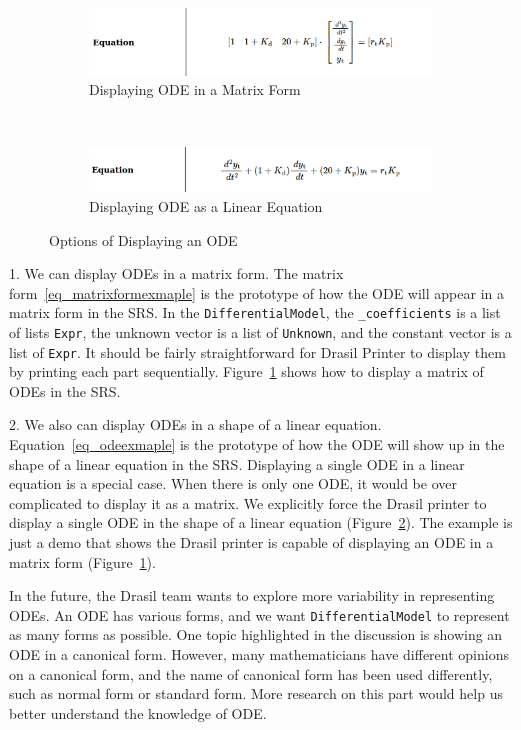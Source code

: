 \begin{figure}[ht]
	\centering
	\begin{subfigure}[t]{\textwidth}
		\centering
		
\includegraphics[width=1\textwidth]{figures/ODEInMatrix.png}
		\caption{Displaying ODE in a Matrix Form}
		\label{fig_multienv_odematrix}
	\end{subfigure}
	~
	\begin{subfigure}[t]{\textwidth}
		\centering
	
\includegraphics[width=1\textwidth]{figures/ODEInLinearEq.png}
		\caption{Displaying ODE as a Linear Equation}
		\label{fig_multienv_odelinear}
	\end{subfigure}
	
	\caption{Options of Displaying an ODE}
	\label{fig_multienv}
\end{figure}

1. We can display ODEs in a matrix form. The matrix form~\ref{eq_matrixformexmaple} is the prototype of how the ODE will appear in a matrix form in the SRS. In the \verb|DifferentialModel|, the \verb|_coefficients| is a list of lists \verb|Expr|, the unknown vector is a list of \verb|Unknown|, and the constant vector is a list of \verb|Expr|. It should be fairly straightforward for Drasil Printer to display them by printing each part sequentially. Figure~\ref{fig_multienv_odematrix} shows how to display a matrix of ODEs in the SRS. 

2. We also can display ODEs in a shape of a linear equation. Equation~\ref{eq_odeexmaple} is the prototype of how the ODE will show up in the shape of a linear equation in the SRS. Displaying a single ODE in a linear equation is a special case. When there is only one ODE, it would be over complicated to display it as a matrix. We explicitly force the Drasil printer to display a single ODE in the shape of a linear equation (Figure~\ref{fig_multienv_odelinear}). The example is just a demo that shows the Drasil printer is capable of displaying an ODE in a matrix form (Figure~\ref{fig_multienv_odematrix}).

In the future, the Drasil team wants to explore more variability in representing ODEs. An ODE has various forms, and we want \verb|DifferentialModel| to represent as many forms as possible. One topic highlighted in the discussion is showing an ODE in a canonical form. However, many mathematicians have different opinions on a canonical form, and the name of canonical form has been used differently, such as normal form or standard form. More research on this part would help us better understand the knowledge of ODE.

